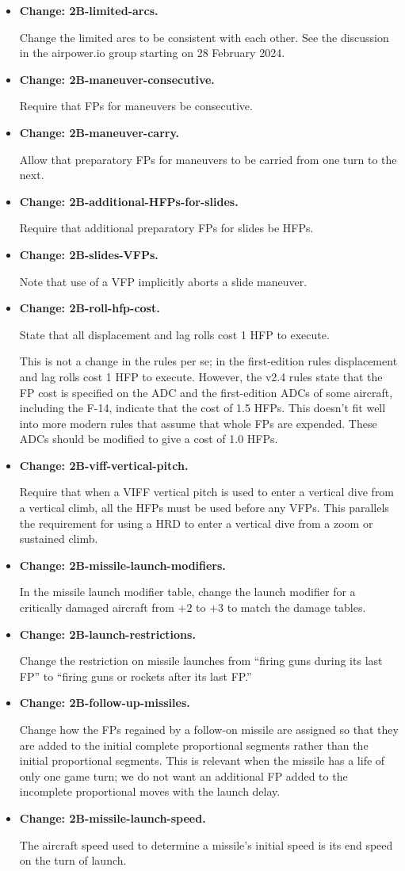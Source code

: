 \documentclass[10pt]{report}
\newcommand{\itemtag}[1]{\item \textbf{Change: #1.}\par}
\begin{document}
\begin{itemize}
    \itemtag{2B-limited-arcs} Change the limited arcs to be consistent with each other. See the discussion in the airpower.io group starting on 28 February 2024.

    \itemtag{2B-maneuver-consecutive} Require that FPs for maneuvers be consecutive.

    \itemtag{2B-maneuver-carry} Allow that preparatory FPs for maneuvers to be carried from one turn to the next.
    
    \itemtag{2B-additional-HFPs-for-slides} Require that additional preparatory FPs for slides be HFPs.
    
    \itemtag{2B-slides-VFPs} Note that use of a VFP implicitly aborts a slide maneuver.

    \itemtag{2B-roll-hfp-cost} State that all displacement and lag rolls cost 1 HFP to execute.

    This is not a change in the rules per se; in the first-edition rules displacement and lag rolls cost 1 HFP to execute. However, the v2.4 rules state that the FP cost is specified on the ADC and the first-edition ADCs of some aircraft, including the F-14, indicate that the cost of 1.5 HFPs. This doesn't fit well into more modern rules that assume that whole FPs are expended. These ADCs should be modified to give a cost of 1.0 HFPs.
    
    \itemtag{2B-viff-vertical-pitch} Require that when a VIFF vertical pitch is used to enter a vertical dive from a vertical climb, all the HFPs must be used before any VFPs. This parallels the requirement for using a HRD to enter a vertical dive from a zoom or sustained climb.

    \itemtag{2B-missile-launch-modifiers} In the missile launch modifier table, change the launch modifier for a critically damaged aircraft from $+2$ to $+3$ to match the damage tables.
    
    \itemtag{2B-launch-restrictions} Change the restriction on missile launches from “firing guns during its last FP” to “firing guns or rockets after its last FP.”

    \itemtag{2B-follow-up-missiles} Change how the FPs regained by a follow-on missile are assigned so that they are added to the initial complete proportional segments rather than the initial proportional segments. This is relevant when the missile has a life of only one game turn; we do not want an additional FP added to the incomplete proportional moves with the launch delay.
    
    \itemtag{2B-missile-launch-speed} The aircraft speed used to determine a missile's initial speed is its end speed on the turn of launch.
    

\end{itemize}
\end{document}
